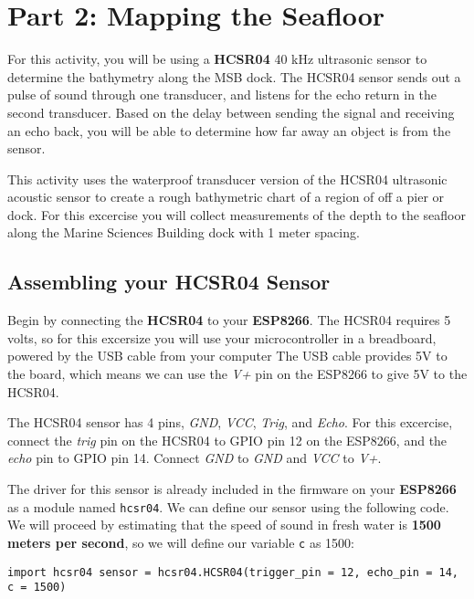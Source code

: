 \documentclass[11pt]{article}
\begin{document}
    \hypertarget{part-2-mapping-the-seafloor}{%
\section{Part 2: Mapping the
Seafloor}\label{part-2-mapping-the-seafloor}}

For this activity, you will be using a \textbf{HCSR04} 40 kHz ultrasonic
sensor to determine the bathymetry along the MSB dock. The HCSR04 sensor
sends out a pulse of sound through one transducer, and listens for the
echo return in the second transducer. Based on the delay between sending
the signal and receiving an echo back, you will be able to determine how
far away an object is from the sensor.

This activity uses the waterproof transducer version of the HCSR04
ultrasonic acoustic sensor to create a rough bathymetric chart of a
region of off a pier or dock. For this excercise you will collect
measurements of the depth to the seafloor along the Marine Sciences
Building dock with 1 meter spacing.

\hypertarget{assembling-your-hcsr04-sensor}{%
\subsection{Assembling your HCSR04
Sensor}\label{assembling-your-hcsr04-sensor}}

Begin by connecting the \textbf{HCSR04} to your \textbf{ESP8266}. The
HCSR04 requires 5 volts, so for this excersize you will use your
microcontroller in a breadboard, powered by the USB cable from your
computer The USB cable provides 5V to the board, which means we can use
the \emph{V+} pin on the ESP8266 to give 5V to the HCSR04.

The HCSR04 sensor has 4 pins, \emph{GND}, \emph{VCC}, \emph{Trig}, and
\emph{Echo}. For this excercise, connect the \emph{trig} pin on the
HCSR04 to GPIO pin 12 on the ESP8266, and the \emph{echo} pin to GPIO
pin 14. Connect \emph{GND} to \emph{GND} and \emph{VCC} to \emph{V+}.

The driver for this sensor is already included in the firmware on your
\textbf{ESP8266} as a module named \texttt{hcsr04}. We can define our
sensor using the following code. We will proceed by estimating that the
speed of sound in fresh water is \textbf{1500 meters per second}, so we
will define our variable \texttt{c} as 1500:

\texttt{import\ hcsr04\ sensor\ =\ hcsr04.HCSR04(trigger\_pin\ =\ 12,\ echo\_pin\ =\ 14,\ c\ =\ 1500)}
\end{document}
